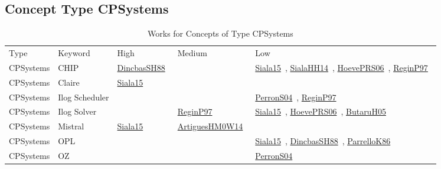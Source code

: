 \clearpage
\subsection{Concept Type CPSystems}
\label{sec:CPSystems}
{\scriptsize
\begin{longtable}{lp{3cm}>{\raggedright\arraybackslash}p{6cm}>{\raggedright\arraybackslash}p{6cm}>{\raggedright\arraybackslash}p{8cm}}
\rowcolor{white}\caption{Works for Concepts of Type CPSystems}\\ \toprule
\rowcolor{white}Type & Keyword & High & Medium & Low\\ \midrule\endhead
\bottomrule
\endfoot
CPSystems & CHIP & \href{../cars/works/DincbasSH88.pdf}{DincbasSH88}~\cite{DincbasSH88} &  & \href{../cars/works/Siala15.pdf}{Siala15}~\cite{Siala15}, \href{../cars/works/SialaHH14.pdf}{SialaHH14}~\cite{SialaHH14}, \href{../cars/works/HoevePRS06.pdf}{HoevePRS06}~\cite{HoevePRS06}, \href{../cars/works/ReginP97.pdf}{ReginP97}~\cite{ReginP97}\\
CPSystems & Claire & \href{../cars/works/Siala15.pdf}{Siala15}~\cite{Siala15} &  & \\
CPSystems & Ilog Scheduler &  &  & \href{../cars/works/PerronS04.pdf}{PerronS04}~\cite{PerronS04}, \href{../cars/works/ReginP97.pdf}{ReginP97}~\cite{ReginP97}\\
CPSystems & Ilog Solver &  & \href{../cars/works/ReginP97.pdf}{ReginP97}~\cite{ReginP97} & \href{../cars/works/Siala15.pdf}{Siala15}~\cite{Siala15}, \href{../cars/works/HoevePRS06.pdf}{HoevePRS06}~\cite{HoevePRS06}, \href{../cars/works/ButaruH05.pdf}{ButaruH05}~\cite{ButaruH05}\\
CPSystems & Mistral & \href{../cars/works/Siala15.pdf}{Siala15}~\cite{Siala15} & \href{../cars/works/ArtiguesHM0W14.pdf}{ArtiguesHM0W14}~\cite{ArtiguesHM0W14} & \\
CPSystems & OPL &  &  & \href{../cars/works/Siala15.pdf}{Siala15}~\cite{Siala15}, \href{../cars/works/DincbasSH88.pdf}{DincbasSH88}~\cite{DincbasSH88}, \href{../cars/works/ParrelloK86.pdf}{ParrelloK86}~\cite{ParrelloK86}\\
CPSystems & OZ &  &  & \href{../cars/works/PerronS04.pdf}{PerronS04}~\cite{PerronS04}\\
\end{longtable}
}

